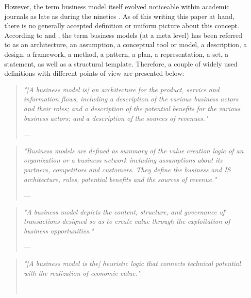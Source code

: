 However, the term business model itself evolved noticeable within academic journals as late as during the nineties . As of this writing this paper at hand, there is no generally accepted definition or uniform picture about this concept. According to \citet[p. 726]{Morris2005} and \citet[p. 1022]{Zott2011}, the term business models (at a meta level) has been referred to as an architecture, an assumption, a conceptual tool or model, a description, a design, a framework, a method, a pattern, a plan, a representation, a set, a statement, as well as a structural template. Therefore, a couple of widely used definitions with different points of view are presented below:
	
\begin{quote}{\slshape 
"[A business model is] an architecture for the product, service and information flows, including a description of the various business actors and their roles; and a description of the potential benefits for the various business actors; and a description of the sources of revenues."}
\vspace*{-7pt}
\begin{flushright}
	--- \citet[p. 2]{Timmers1998}
\end{flushright}
\end{quote}

\begin{quote}{\slshape 
"Business models are defined as summary of the value creation logic of an organization or a business network including assumptions about its partners, competitors and customers. They define the business and IS architecture, rules, potential benefits and the sources of revenue."}
\vspace*{-7pt}
\begin{flushright}
	--- \citet[p. 798]{Klueber2000}
\end{flushright}
\end{quote}

\begin{quote}{\slshape 
"A business model depicts the content, structure, and governance of transactions designed so as to create value through the exploitation of business opportunities."}
\vspace*{-7pt}
\begin{flushright}
	--- \citet[p. 511]{Amit2001}
\end{flushright}
\end{quote}

\begin{quote}{\slshape 
"[A business model is the] heuristic logic that connects technical potential with the realization of economic value."}
\vspace*{-7pt}
\begin{flushright}
	--- \citet[p. 529]{Chesbrough2002}
\end{flushright}
\end{quote}

